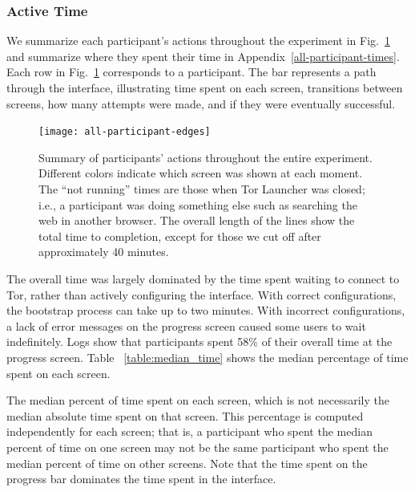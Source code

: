 \documentclass[USenglish,oneside,twocolumn]{article}
\begin{document}
\subsubsection{Active Time} 
We summarize each participant's actions throughout the experiment in Fig.~\ref{fig:all-participant-edges} and summarize where they spent their time in Appendix~\ref{all-participant-times}. Each row in Fig.~\ref{fig:all-participant-edges} corresponds to a participant. The bar represents a path through the interface, illustrating time spent on each screen, transitions between screens, how many attempts were made, and if they were eventually successful. 

\begin{figure}
\centering
\texttt{[image: all-participant-edges]}
\caption{
Summary of participants' actions throughout the entire experiment.
Different colors indicate which screen was shown at each moment.
The ``not running'' times are those when Tor Launcher was closed;
i.e., a participant was doing something else
such as searching the web in another browser.
The overall length of the lines show the total time to completion,
except for those we cut off after approximately 40 minutes.
}
\label{fig:all-participant-edges}
\end{figure}

The overall time was largely dominated by the time spent waiting to connect to Tor, rather than actively configuring the interface. With correct configurations, the bootstrap process can take up to two minutes.  With incorrect configurations, a lack of error messages on the progress screen caused some users to wait indefinitely.  Logs show that participants spent 58\% of their overall time at the progress screen. Table ~\ref{table:median_time} shows the median percentage of time spent on each screen. 

\begin{table}[t]
\centering

\caption{The median percent of time spent on each screen, which is not
necessarily the median absolute time spent on that screen. 
This percentage is computed independently for each screen; that is, a participant who spent the median percent 
of time on one screen may not be the same participant who spent the median percent
of time on other screens. Note that the time spent on the progress bar dominates the 
time spent in the interface.} 
\label{table:median_time}
\end{table}
\end{document}

